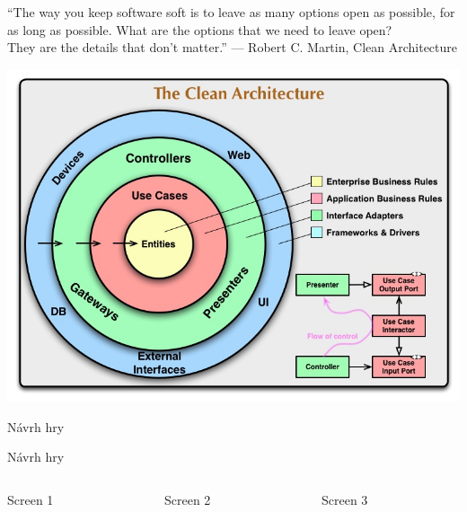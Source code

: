 \documentclass[czech,aspectratio=169]{beamer}
\begin{document}
  \begin{frame}
      \begin{center}
        {\large ``The way you keep software soft is
      to leave as many options open as possible,
      for as long as possible.
      What are the options that we need to leave open?\\
      They are the details
      that don’t matter.''}
      \vskip5mm
      --- Robert C. Martin, Clean Architecture
      \end{center}
  \end{frame}

  \begin{frame}
    \begin{center}
      \includegraphics[width=.6\textwidth]{slides/logo-clean-architecture}
    \end{center}
  \end{frame}

  \begin{frame}{Návrh hry}
  \end{frame}

  \begin{frame}{Návrh hry}

  \end{frame}

  \begin{frame}
    \begin{columns}
      \begin{column}{.33\textwidth}
        \begin{center}
          Screen 1
        \end{center}
      \end{column}
      \begin{column}{.33\textwidth}
        \begin{center}
          Screen 2
        \end{center}
      \end{column}
      \begin{column}{.33\textwidth}
        \begin{center}
          Screen 3
        \end{center}
      \end{column}
    \end{columns}
  \end{frame}
\end{document}
